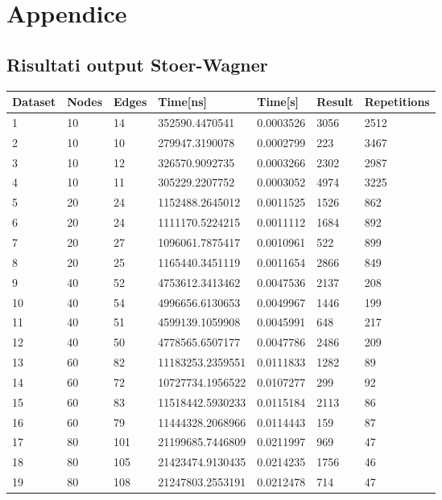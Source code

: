 \section{Appendice}

\subsection{Risultati output Stoer-Wagner}

\begin{longtable}[c]{lllllll}
  \textbf{Dataset} & \textbf{Nodes} & \textbf{Edges} & \textbf{Time{[}ns{]}} & \textbf{Time{[}s{]}} & \textbf{Result} & \textbf{Repetitions} \\
  \endhead
  1 & 10 & 14 & 352590.4470541 & 0.0003526 & 3056 & 2512 \\
  2 & 10 & 10 & 279947.3190078 & 0.0002799 & 223 & 3467 \\
  3 & 10 & 12 & 326570.9092735 & 0.0003266 & 2302 & 2987 \\
  4 & 10 & 11 & 305229.2207752 & 0.0003052 & 4974 & 3225 \\
  5 & 20 & 24 & 1152488.2645012 & 0.0011525 & 1526 & 862 \\
  6 & 20 & 24 & 1111170.5224215 & 0.0011112 & 1684 & 892 \\
  7 & 20 & 27 & 1096061.7875417 & 0.0010961 & 522 & 899 \\
  8 & 20 & 25 & 1165440.3451119 & 0.0011654 & 2866 & 849 \\
  9 & 40 & 52 & 4753612.3413462 & 0.0047536 & 2137 & 208 \\
  10 & 40 & 54 & 4996656.6130653 & 0.0049967 & 1446 & 199 \\
  11 & 40 & 51 & 4599139.1059908 & 0.0045991 & 648 & 217 \\
  12 & 40 & 50 & 4778565.6507177 & 0.0047786 & 2486 & 209 \\
  13 & 60 & 82 & 11183253.2359551 & 0.0111833 & 1282 & 89 \\
  14 & 60 & 72 & 10727734.1956522 & 0.0107277 & 299 & 92 \\
  15 & 60 & 83 & 11518442.5930233 & 0.0115184 & 2113 & 86 \\
  16 & 60 & 79 & 11444328.2068966 & 0.0114443 & 159 & 87 \\
  17 & 80 & 101 & 21199685.7446809 & 0.0211997 & 969 & 47 \\
  18 & 80 & 105 & 21423474.9130435 & 0.0214235 & 1756 & 46 \\
  19 & 80 & 108 & 21247803.2553191 & 0.0212478 & 714 & 47 \\

\end{longtable}
